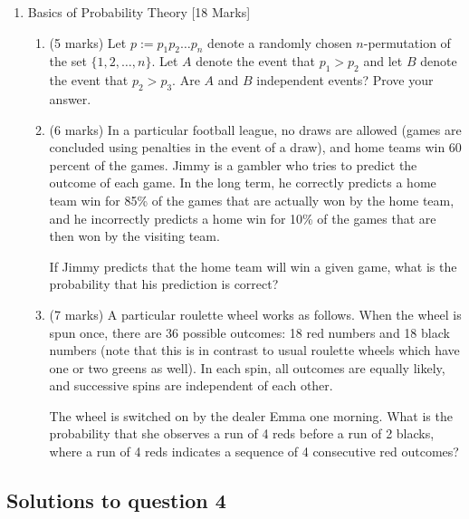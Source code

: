 \documentclass{article}
\begin{document}
\begin{enumerate}
    \item Basics of Probability Theory [18 Marks]
          \begin{enumerate}
              \item (5 marks) Let \( p := p_1 p_2 \dots p_n \) denote a randomly chosen \( n \)-permutation of the set \(\{1, 2, \dots, n\}\). Let \( A \) denote the event that \( p_1 > p_2 \) and let \( B \) denote the event that \( p_2 > p_3 \). Are \( A \) and \( B \) independent events? Prove your answer.

              \item (6 marks) In a particular football league, no draws are allowed (games are concluded using penalties in the event of a draw), and home teams win 60 percent of the games. Jimmy is a gambler who tries to predict the outcome of each game. In the long term, he correctly predicts a home team win for 85\% of the games that are actually won by the home team, and he incorrectly predicts a home win for 10\% of the games that are then won by the visiting team.

                    If Jimmy predicts that the home team will win a given game, what is the probability that his prediction is correct?

              \item (7 marks) A particular roulette wheel works as follows. When the wheel is spun once, there are 36 possible outcomes: 18 red numbers and 18 black numbers (note that this is in contrast to usual roulette wheels which have one or two greens as well). In each spin, all outcomes are equally likely, and successive spins are independent of each other.

                    The wheel is switched on by the dealer Emma one morning. What is the probability that she observes a run of 4 reds before a run of 2 blacks, where a run of 4 reds indicates a sequence of 4 consecutive red outcomes?
          \end{enumerate}
\end{enumerate}

\subsection*{Solutions to question 4}
\end{document}
